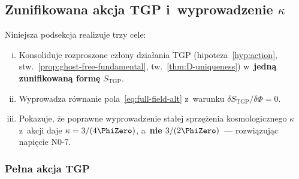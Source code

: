 \subsection{Zunifikowana akcja TGP i~wyprowadzenie $\kappa$}%
\label{ssec:unified-action}


Niniejsza podsekcja realizuje trzy cele:
\begin{enumerate}[(i)]
  \item Konsoliduje rozproszone cz\l{}ony dzia\l{}ania TGP
    (hipoteza~\ref{hyp:action}, stw.~\ref{prop:ghost-free-fundamental},
    tw.~\ref{thm:D-uniqueness}) w~\textbf{jedn\k{a} zunifikowan\k{a}
    form\k{e}} $S_{\mathrm{TGP}}$.
  \item Wyprowadza r\'ownanie pola~\eqref{eq:full-field-alt}
    z~warunku $\delta S_{\mathrm{TGP}}/\delta\Phi = 0$.
  \item Pokazuje, \.ze poprawne wyprowadzenie sta\l{}ej sprz\k{e}\.zenia
    kosmologicznego $\kappa$ z~akcji daje
    $\kappa = 3/(4\PhiZero)$, a~\textbf{nie} $3/(2\PhiZero)$~---
    rozwi\k{a}zuj\k{a}c napi\k{e}cie N0-7.
\end{enumerate}

\subsubsection{Pe\l{}na akcja TGP}\label{sssec:full-action}

